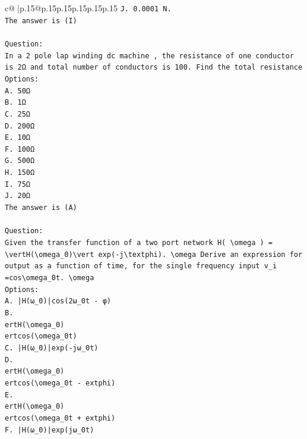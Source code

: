 \documentclass{article}
\begin{document}
{\begin{supertabular}{c@{$\;$}|p{.15\linewidth}@{}p{.15\linewidth}p{.15\linewidth}p{.15\linewidth}p{.15\linewidth}p{.15\linewidth}}
{{{\texttt{J. 0.0001 N.} \\
\texttt{The answer is (I)} \\
\\ 
\texttt{Question:} \\
\texttt{In a 2 pole lap winding dc machine , the resistance of one conductor is 2Ω and total number of conductors is 100. Find the total resistance} \\
\texttt{Options:} \\
\texttt{A. 50Ω} \\
\texttt{B. 1Ω} \\
\texttt{C. 25Ω} \\
\texttt{D. 200Ω} \\
\texttt{E. 10Ω} \\
\texttt{F. 100Ω} \\
\texttt{G. 500Ω} \\
\texttt{H. 150Ω} \\
\texttt{I. 75Ω} \\
\texttt{J. 20Ω} \\
\texttt{The answer is (A)} \\
\\ 
\texttt{Question:} \\
\texttt{Given the transfer function of a two port network H( \textbackslash{}omega ) = \textbackslash{}vertH(\textbackslash{}omega\_0)\textbackslash{}vert exp({-}j\textbackslash{}textphi). \textbackslash{}omega Derive an expression for output as a function of time, for the single frequency input v\_i =cos\textbackslash{}omega\_0t. \textbackslash{}omega} \\
\texttt{Options:} \\
\texttt{A. |H(ω\_0)|cos(2ω\_0t {-} φ)} \\
\texttt{B. } \\
\texttt{ertH(\textbackslash{}omega\_0)} \\
\texttt{ertcos(\textbackslash{}omega\_0t)} \\
\texttt{C. |H(ω\_0)|exp({-}jω\_0t)} \\
\texttt{D. } \\
\texttt{ertH(\textbackslash{}omega\_0)} \\
\texttt{ertcos(\textbackslash{}omega\_0t {-} 	extphi)} \\
\texttt{E. } \\
\texttt{ertH(\textbackslash{}omega\_0)} \\
\texttt{ertcos(\textbackslash{}omega\_0t + 	extphi)} \\
\texttt{F. |H(ω\_0)|exp(jω\_0t)} \\
}}}
\end{supertabular}}
\end{document}
